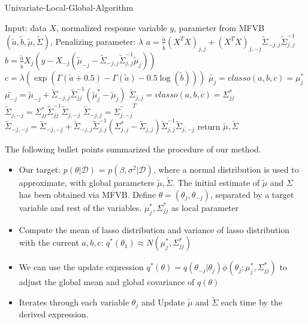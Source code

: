 \newpage
\begin{algorithm}
	\caption{Univariate-Local-Global-Algorithm}
	\begin{algorithmic}[1]
		
    \State Input: data $X$, normalized response variable $y$, parameter from MFVB $(\tilde{a},\tilde{b},\tilde{\mu},\tilde{\Sigma})$, Penalizing parameter: $\lambda$
	\State $a = \frac{\tilde{a}}{\tilde{b}}(X^TX)_{j,j} + (X^TX)_{j,-j}\tilde{\Sigma}_{-j,j}\tilde{\Sigma}_{j,j}^{-1}$ 
	\State $b = \frac{\tilde{a}}{\tilde{b}}  X_{j}(y-X_{-j}(\tilde{\mu}_{-j} - \tilde{\Sigma}_{-j,j}\tilde{\Sigma}_{j,j}^{-1}\tilde{\mu}_j))       $ 
	\State $c = \lambda (\exp(\Gamma(\tilde{a}+0.5) - \Gamma(\tilde{a}) - 0.5\log(\tilde{b})))  $ 
	\State $\tilde{\mu_{j}} =  elasso(a,b,c) = \mu_j ^*$ 
	\State $\tilde{\mu_{-j}} = \tilde{\mu}_{-j} +  \tilde{\Sigma}_{-j,j}\tilde{\Sigma}^{-1}_{jj}(\tilde{\mu}_j^*-\tilde{\mu}_j)$ 
	\State $\tilde{\Sigma}_{j,j} = vlasso(a,b,c) = \Sigma_{jj}^*$ 
	\State $\tilde{\Sigma}_{j,-j} = \Sigma_{jj}^*  \tilde{\Sigma}_{jj}^{-1}\tilde{\Sigma}_{j,-j} $ 
	\State $\tilde{\Sigma}_{-j,j} = \tilde{\Sigma_{j,-j}}^T$ 
	\State $\tilde{\Sigma}_{-j,-j} = \tilde{\Sigma}_{-j,-j} + \tilde{\Sigma}_{-j,j}\tilde{\Sigma}_{j,j}^{-1}(\Sigma_{j,j}^{*} - \tilde{\Sigma}_{j,j})\tilde{\Sigma}_{j,j}^{-1}\tilde{\Sigma}_{j,-j}$ 		
	\EndFor
	\EndWhile
	\State return $\tilde{\mu},\tilde{\Sigma}$
	\end{algorithmic}
\end{algorithm}


The following bullet points summarized the procedure of our method.
\begin{itemize}
	\item Our target: $p(\theta|\mathcal{D})$ = $p(\beta, \sigma^2|\mathcal{D})$, where a normal distribution is used to approximate, with global parameters $\tilde{\mu},\tilde{\Sigma}$. The initial estimate of $\tilde{\mu}$ and $\Sigma$ has been obtained via MFVB. Define $\theta = (\theta_j,\theta_{-j})$, separated by a target variable and rest of the variables. $\mu_{j}^*, \Sigma_{jj}^*$ as local parameter
	
	
	\item Compute the mean of lasso distribution and variance of lasso distribution with the current $a,b,c$: $q^*(\theta_1) \approx N(\mu_j^*,\Sigma_{jj}^*)$
	\item We can use the update expression $q^*(\theta) = q(\theta_{-j}|\theta_j)\phi(\theta_j;\mu_j^*,\Sigma_{jj}^*)$ to adjust the global mean and global covariance of $q(\theta)$
	\item Iterates through each variable $\theta_j$ and Update $\tilde{\mu}$ and $\tilde{\Sigma}$ each time by the derived expression.
\end{itemize}

